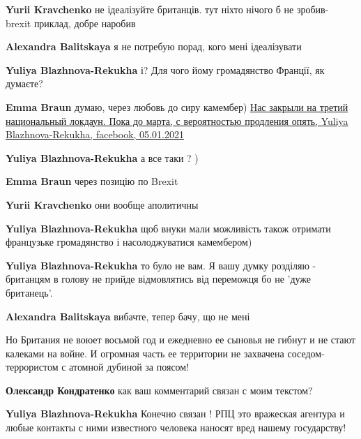 \begin{itemize}
\begin{itemize}
\textbf{Yurii Kravchenko} не ідеалізуйте британців. тут ніхто нічого б не зробив- brexit приклад, добре наробив

\textbf{Alexandra Balitskaya} я не потребую порад, кого мені ідеалізувати

\textbf{Yuliya Blazhnova-Rekukha} і? Для чого йому громадянство Франції, як думаєте?

\textbf{Emma Braun} думаю, через любовь до сиру камембер)
\href{https://www.facebook.com/100006864096210/posts/2747022728869837/}{%
Нас  закрыли на третий национальный локдаун. Пока до марта, с вероятностью продления опять, %
Yuliya Blazhnova-Rekukha, facebook, 05.01.2021}

\textbf{Yuliya Blazhnova-Rekukha} а все таки ? )

\textbf{Emma Braun} через позицію по Brexit

\textbf{Yurii Kravchenko} они вообще аполитичны

\textbf{Yuliya Blazhnova-Rekukha} щоб внуки мали можливість також отримати французьке громадянство і насолоджуватися камембером)

\textbf{Yuliya Blazhnova-Rekukha} то було не вам. Я вашу думку розділяю - британцям в голову не прийде відмовлятись від переможця бо не 'дуже британець'.

\textbf{Alexandra Balitskaya} вибачте, тепер бачу, що не мені

\end{itemize} %


Но Британия не воюет восьмой год и ежедневно ее сыновья не гибнут и не стают
калеками на войне. И огромная часть ее территории не захвачена
соседом-террористом с атомной дубиной за поясом!

\begin{itemize} %
\textbf{Олександр Кондратенко} как ваш комментарий связан с моим текстом?

\textbf{Yuliya Blazhnova-Rekukha} Конечно связан ! РПЦ это вражеская агентура и любые контакты с ними известного человека наносят вред нашему государству!


\end{itemize}
\end{itemize}
